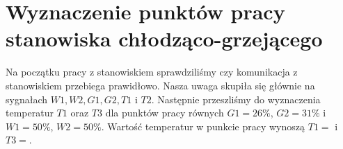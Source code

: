 \chapter{Wyznaczenie punktów pracy stanowiska chłodząco-grzejącego}
\label{thermal_punkty_pracy}
Na początku pracy z stanowiskiem sprawdziliśmy czy komunikacja z stanowiskiem przebiega prawidłowo. Nasza uwaga skupiła się głównie na sygnałach $W1, W2, G1, G2, T1$ i $T2$. Następnie przeszliśmy do wyznaczenia temperatur $T1$ oraz $T3$ dla punktów pracy równych $G1 = 26\%$, $G2 =31\%$ i $W1 = 50\%$, $W2 = 50\%$. Wartość temperatur w punkcie pracy wynoszą $T1 = $ i $T3 = $.


